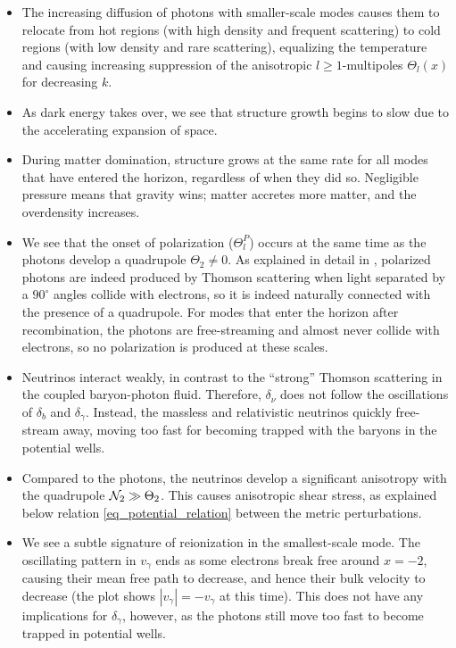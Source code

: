 \documentclass[10pt,a4paper]{article}
\begin{document}
\begin{itemize}
\item
The increasing diffusion of photons with smaller-scale modes
causes them to relocate
from hot regions (with high density and frequent scattering)
to cold regions (with low density and rare scattering),
equalizing the temperature and causing increasing suppression of the anisotropic $l \geq 1$-multipoles $\Theta_l(x)$ for decreasing $k$.

\item
As dark energy takes over,
we see that structure growth begins to slow due to the accelerating expansion of space.

\item
During matter domination,
structure grows at the same rate for all modes that have entered the horizon,
regardless of when they did so.
Negligible pressure means that gravity wins; matter accretes more matter, and the overdensity increases.

\item
We see that the onset of polarization ($\Theta^P_l$) occurs at the same time as the photons develop a quadrupole $\Theta_2 \neq 0$.
As explained in detail in \cite[section 10.2]{dodelsonModernCosmology2021},
polarized photons are indeed produced by Thomson scattering when light separated by a $90^\circ$ angles collide with electrons,
so it is indeed naturally connected with the presence of a quadrupole.
For modes that enter the horizon after recombination,
the photons are free-streaming and almost never collide with electrons,
so no polarization is produced at these scales.

\item
Neutrinos interact weakly, in contrast to the ``strong'' Thomson scattering in the coupled baryon-photon fluid.
Therefore, $\delta_\nu$ does not follow the oscillations of $\delta_b$ and $\delta_\gamma$.
Instead, the massless and relativistic neutrinos quickly free-stream away, moving too fast for becoming trapped with the baryons in the potential wells.

\item
Compared to the photons, the neutrinos develop a significant anisotropy with the quadrupole $\mathcal{N}_2 \gg \Theta_2$.
This causes anisotropic shear stress, as explained below relation \eqref{eq_potential_relation} between the metric perturbations.

\item
We see a subtle signature of reionization in the smallest-scale mode.
The oscillating pattern in $v_\gamma$ ends as some electrons break free around $x=-2$,
causing their mean free path to decrease, and hence their bulk velocity to decrease (the plot shows $|v_\gamma| = -v_\gamma$ at this time).
This does not have any implications for $\delta_\gamma$, however,
as the photons still move too fast to become trapped in potential wells.


\end{itemize}
\end{document}
